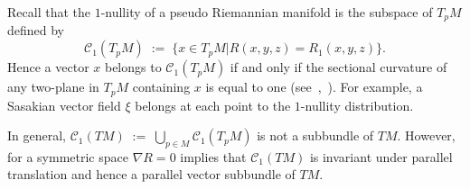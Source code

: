 \documentclass[11pt,a4paper]{article}
\theoremstyle{plain}
\theoremstyle{remark}
\newcommand{\scrC}{\mathcal{C}}
\begin{document}
Recall that the $1$-nullity of a pseudo Riemannian manifold is the subspace of $T_pM$ defined by
\begin{equation}\label{eq:curvature_constancy}
\scrC_1(T_pM)\;:=\;\{x\in T_pM| R(x,y,z)= R_1(x,y,z)\}.
\end{equation}
Hence a vector $x$ belongs to $\scrC_1(T_pM)$ if and only if the sectional curvature of any two-plane in $T_pM$ containing $x$ is equal to one (see~\cite{Gray1},~\cite{MoSe1}).
For example, a Sasakian vector field $\xi$ belongs at each point to the
$1$-nullity distribution. 

In general, $\scrC_1(TM)\;:=\;\bigcup_{p\in M}\scrC_1(T_pM)$ is not a subbundle of $TM$. However, for a symmetric space $\nabla R = 0$ implies that $\scrC_1(TM)$ is invariant under parallel translation and hence a parallel vector subbundle of $TM$.
\end{document}

